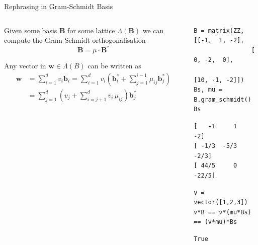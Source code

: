 \documentclass[presentation,smaller]{beamer}
\renewcommand{\vec}[1]{\mathbf{#1}\xspace}
\newcommand{\mat}[1]{\mathbf{#1}\xspace}
\begin{document}
\begin{frame}[fragile,label={sec:org7e19015}]{Rephrasing in Gram-Schmidt Basis}
 \begin{columns}[t]
\begin{column}{0.6\columnwidth}
Given some basis \(\mat{B}\) for some lattice \(Λ(\mat{B})\) we can compute the Gram-Schmidt orthogonalisation \[\mat{B} = μ \cdot \mat{B}^*\]

Any vector in \(\vec{w} \in Λ(B)\) can be written as 
\begin{align*}
\vec{w} &= \sum_{i=1}^d v_i \vec{b}_i = \sum_{i=1}^{d} v_i \left(\vec{b}_i^* + \sum_{j=1}^{i-1} \mu_{ij} \vec{b}_j^* \right)\\
        &= \sum_{j=1}^{d} \left(v_j  + \sum_{i=j+1}^{d} v_i\, \mu_{ij} \right) \vec{b}_j^* 
\end{align*}
\end{column}

\begin{column}{0.4\columnwidth}
\lstset{language=sage,label= ,caption= ,captionpos=b,numbers=none}
\begin{lstlisting}
B = matrix(ZZ, [[-1,  1, -2], 
                [ 0, -2,  0], 
                [10, -1, -2]])
Bs, mu = B.gram_schmidt()
Bs
\end{lstlisting}

\begin{verbatim}
[   -1     1    -2]
[ -1/3  -5/3  -2/3]
[ 44/5     0 -22/5]
\end{verbatim}


\lstset{language=sage,label= ,caption= ,captionpos=b,numbers=none}
\begin{lstlisting}
v = vector([1,2,3])
v*B == v*(mu*Bs) == (v*mu)*Bs
\end{lstlisting}

\begin{verbatim}
True
\end{verbatim}
\end{column}
\end{columns}
\end{frame}
\end{document}
